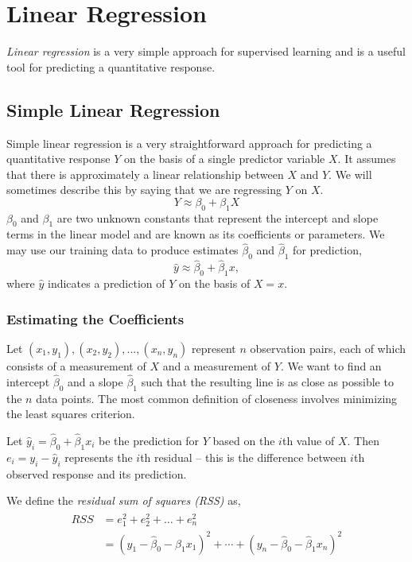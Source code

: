 \documentclass{article}
\numberwithin{equation}{section}
\begin{document}
\newpage
\section{Linear Regression}
\textit{Linear regression} is a very simple approach for supervised learning and is a useful tool for predicting a quantitative response.

\subsection{Simple Linear Regression}

Simple linear regression  is a very straightforward approach for predicting a quantitative response $Y$ on the basis of a single predictor variable $X$. It assumes that there is approximately a linear relationship between $X$ and $Y$. We will sometimes describe this by saying that we are regressing $Y$ on $X$.
\begin{equation}
    Y \approx \beta_0 + \beta_1 X
\end{equation}
$\beta_0$ and $\beta_1$ are two unknown constants that represent the intercept and slope terms in the linear model and are known as its coefficients or parameters. We may use our training data to produce estimates $\hat \beta_0$ and $\hat \beta_1$ for prediction,
\begin{equation}
    \hat y  \approx \hat \beta_0 + \hat \beta_1 x,
\end{equation}
where $\hat y$ indicates a prediction of $Y$ on the basis of $X = x$.


\subsubsection{Estimating the Coefficients}
Let $(x_1, y_1), (x_2, y_2),..., (x_n, y_n)$ represent $n$ observation pairs, each of which consists of a measurement of $X$ and a measurement of $Y$. We want to find an intercept $\hat \beta_0 $ and a slope $\hat \beta_1$ such that the resulting line is as close as possible to the $n$ data points. The most common definition of closeness involves minimizing the least squares criterion.

Let $\hat y_i = \hat \beta_0 + \hat \beta_1 x_i$ be the prediction for $Y$ based on the $i$th value of $X$. Then $e_i = y_i - \hat y_i$ represents the $i$th residual -- this is the difference between $i$th observed response and its prediction. 

We define the \textit{residual sum of squares (RSS)} as,
\begin{align}\label{eq:RSS}
\begin{split}
     RSS &= e_1^2 + e_2^2 + \dots + e_n^2\\
     &=  (y_1 - \hat \beta_0 - \hat \beta_1 x_1)^2 + \cdots + 
     (y_n - \hat \beta_0 - \hat \beta_1 x_n)^2
\end{split}
\end{align}
\end{document}
